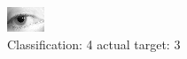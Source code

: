 \begin{figure}[h!]
\begin{center}
\includegraphics[width=0.60\columnwidth]{figures/ID1398_class_4_target_3.png}
\end{center}
\caption{ Classification: 4 actual target: 3}
\label{fig:ID1398_class_4_target_3}
\end{figure}
